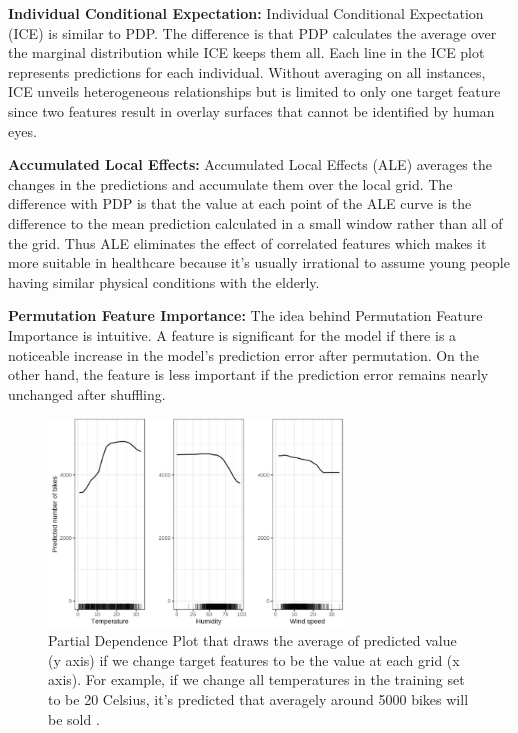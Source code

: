 


\textbf{Individual Conditional Expectation: } Individual Conditional Expectation (ICE) is similar to PDP. The difference is that PDP calculates the average over the marginal distribution while ICE keeps them all. Each line in the ICE plot represents predictions for each individual. Without averaging on all instances, ICE unveils heterogeneous relationships but is limited to only one target feature since two features result in overlay surfaces that cannot be identified by human eyes.

\textbf{Accumulated Local Effects: } Accumulated Local Effects (ALE) averages the changes in the predictions and accumulate them over the local grid. The difference with PDP is that the value at each point of the ALE curve is the difference to the mean prediction calculated in a small window rather than all of the grid. Thus ALE eliminates the effect of correlated features which makes it more suitable in healthcare because it's usually irrational to assume young people having similar physical conditions with the elderly.

\textbf{Permutation Feature Importance: } The idea behind Permutation Feature Importance is intuitive. A feature is significant for the model if there is a noticeable increase in the model's prediction error after permutation. On the other hand, the feature is less important if the prediction error remains nearly unchanged after shuffling.

\begin{figure}[H]
\centering
\includegraphics[width=0.7\textwidth]{figures/chapter_defence/pdp.jpg}
\caption{Partial Dependence Plot that draws the average of predicted value (y axis) if we change target features to be the value at each grid (x axis). For example, if we change all temperatures in the training set to be 20 Celsius, it's predicted that averagely around 5000 bikes will be sold \cite{molnar2019}.}
\label{fig.pdp}
\end{figure}

